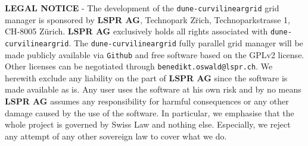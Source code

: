 \documentclass[12pt]{article}
\begin{document}
\begin{titlepage}
\vspace{50mm}
\noindent \textbf{LEGAL NOTICE} - The development of the \texttt{dune-curvilineargrid} grid manager is sponsored by \textbf{LSPR AG},
Technopark Z\"rich, Technoparkstrasse 1, CH-8005 Z\"urich. \textbf{LSPR AG} exclusively holds all rights associated with \texttt{dune-curvilineargrid}.
The \texttt{dune-curvilineargrid} fully parallel grid manager will be made publicly available via \texttt{Github}
and free software based on the GPLv2 license. Other licenses can be negotiated through
\texttt{benedikt.oswald@lspr.ch}.
We herewith exclude any liability on the part of \textbf{LSPR AG} since the software is made available as is. Any user uses the software
at his own risk and by no means \textbf{LSPR AG} assumes any responsibility for harmful consequences or any other damage caused
by the use of the software. In particular, we emphasise that the whole project is governed by Swiss Law and nothing else.  Especially,
we reject any attempt of any other sovereign law to cover what we do.









\pagebreak


\vfill


\end{titlepage}
\end{document}
